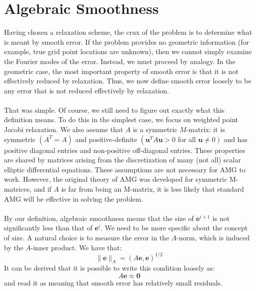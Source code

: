 \documentclass[11pt]{book}
\begin{document}
\section*{Algebraic Smoothness}
Having chosen a relaxation scheme, the crux of the problem is to determine what is meant by smooth error. If the problem provides no geometric information (for example, true grid point locations are unknown), then we cannot simply examine the Fourier modes of the error. Instead, we must proceed by analogy. In the geometric case, the most important property of smooth error is that it is not effectively reduced by relaxation. Thus, we now define smooth error loosely to be any error that is not reduced effectively by relaxation. \\ \\
That was simple. Of course, we still need to figure out exactly what this definition means. To do this in the simplest case, we focus on weighted point Jacobi relaxation. We also assume that $A$ is a symmetric $M$-matrix: it is symmetric $\left(A^{T}=A\right)$ and positive-definite $\left(\mathbf{u}^{T} A \mathbf{u}>0\right.$ for all $\left.\mathbf{u} \neq 0\right)$ and has positive diagonal entries and non-positive off-diagonal entries. These properties are shared by matrices arising from the discretization of many (not all) scalar elliptic differential equations. These assumptions are not necessary for AMG to work. However, the original theory of AMG was developed for symmetric M-matrices, and if $A$ is far from being an M-matrix, it is less likely that standard AMG will be effective in solving the problem. \\ \\
By our definition, algebraic smoothness means that the size of $\mathbf{e}^{i+1}$ is not significantly less than that of $\mathbf{e}^{i}$. We need to be more specific about the concept of size. A natural choice is to measure the error in the $A$-norm, which is induced by the $A$-inner product. We have that:
$$
\|\mathbf{e}\|_{A}=(A \mathbf{e}, \mathbf{e})^{1 / 2}
$$
It can be derived that it is possible to write this condition loosely as:
$$
A \mathbf{e} \approx \mathbf{0}
$$
and read it as meaning that smooth error has relatively small residuals.
\end{document}
